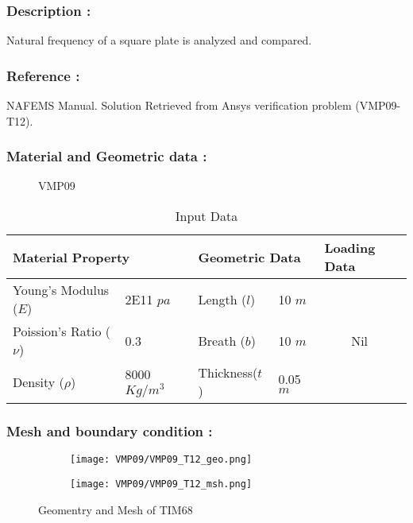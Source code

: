 \documentclass[VM.tex]{subfiles}
\begin{document}
\subsubsection*{Description : }
Natural frequency of a square plate is analyzed and compared. 
\subsubsection*{Reference : }
NAFEMS Manual. Solution Retrieved from Ansys verification problem (VMP09-T12).

\subsubsection*{Material and Geometric data : }


\begin{figure}[h!]
\centering

\caption{VMP09} %
\end{figure}
\begin{table}[ht]
\renewcommand{\arraystretch}{1.5}
\centering
\caption{Input Data}
\begin{tabular}{|ll|ll|ll|}
\hline
\multicolumn{2}{|l|}{\cellcolor[HTML]{C0C0C0}Material Property} & \multicolumn{2}{l|}{\cellcolor[HTML]{C0C0C0}Geometric Data} & \multicolumn{2}{l|}{\cellcolor[HTML]{C0C0C0}Loading Data} \\ \hline  \hline
Young's Modulus ($E$)          & 2E11 $pa$         & Length ($l$)        & 10 $m$        &         &          \\
Poission's Ratio ($\nu$)       & 0.3         & Breath ($b$)        & 10 $m$          &         & Nil       \\ 
Density ($\rho$)       & 8000 $Kg/m^3$         & Thickness($t$)        & 0.05 $m$          &    &        \\ \hline
\end{tabular}
\end{table}




\subsubsection*{Mesh and boundary condition : }



\begin{figure}[h!]
\begin{subfigure}{.45\textwidth}
\texttt{[image: VMP09/VMP09\_T12\_geo.png]}
\end{subfigure} \hfill
\begin{subfigure}{.45\textwidth}
\texttt{[image: VMP09/VMP09\_T12\_msh.png]}
\end{subfigure}
\caption{Geomentry and Mesh of TIM68}
\end{figure}
\end{document}
